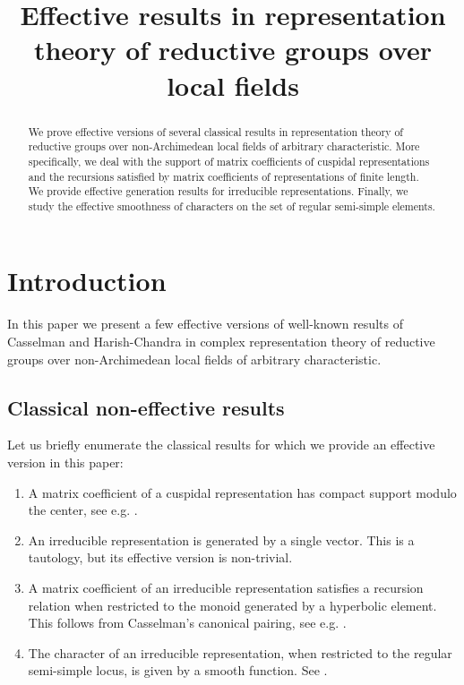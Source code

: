\documentclass[12pt,a4paper]{amsart}%
\newcommand{\RamiA}[1]{{{#1}}}
\newcommand{\RamiF}[1]{{{#1}}}
\newcommand{\DimaA}[1]{{{#1}}}
\begin{document}

    
    

\title{Effective results in representation theory of reductive groups over local fields}
\maketitle
\begin{abstract} 
We prove effective versions of several classical results in representation theory of reductive groups over non-Archimedean local fields  of arbitrary characteristic. {More specifically, we deal with the support of matrix coefficients of cuspidal representations
and the recursions satisfied by matrix coefficients of  representations \RamiF{of finite length}.
We provide effective generation results for irreducible representations.
Finally, we study the
effective smoothness of characters on the set of regular semi-simple elements.}
\end{abstract}

\tableofcontents 
\section{Introduction}
In this paper we present a few effective versions of well-known results of Casselman and Harish-Chandra in complex representation theory of reductive groups over non-Archimedean local fields of arbitrary characteristic. 

\subsection{Classical non-effective results}
Let us briefly enumerate the classical results \RamiA{for which we provide an effective version in} this paper:
\begin{enumerate}
    \item A matrix coefficient of a cuspidal representation has compact support modulo the center, see \DimaA{e.g.} \cite[VI.2.1]{Ren}.
    \item An irreducible representation is generated by a single vector. This is a tautology, but its effective version is non-trivial.
    \item A matrix coefficient of an irreducible representation satisfies a recursion relation when restricted to the monoid generated by a hyperbolic element. This follows from Casselman's canonical pairing, \DimaA{see e.g.} \cite[VI.9.6]{Ren}.
    \item The character of an irreducible representation, when restricted to the regular semi-simple locus, is given by a smooth function. See \cite[\S4, Corollary]{HC_sub}.
\end{enumerate}
\end{document}
